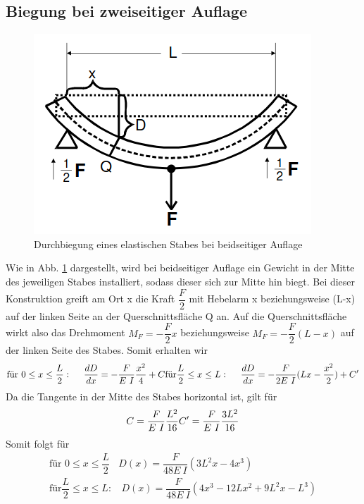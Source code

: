 \subsection{Biegung bei zweiseitiger Auflage}
    \begin{figure}
        \centering
        \includegraphics[scale=0.5]{Gemüsemedley.png}
        \caption{Durchbiegung eines elastischen Stabes bei beidseitiger Auflage}
        \label{fig:gemüse}
    \end{figure}
    Wie in Abb. \ref{fig:gemüse} dargestellt, wird bei beidseitiger Auflage ein Gewicht in der Mitte des 
    jeweiligen Stabes installiert, sodass dieser sich zur Mitte hin biegt. Bei dieser 
    Konstruktion greift am Ort x die Kraft $\dfrac{F}{2}$ mit Hebelarm x 
    beziehungsweise (L-x) auf der linken Seite an der Querschnittsfläche Q
    an. Auf die Querschnittsfläche wirkt also das Drehmoment $M_F = -\dfrac{F}{2} x$ 
    beziehungsweise $M_F = -\dfrac{F}{2}(L-x)$ auf der linken Seite des Stabes.
    Somit erhalten wir 
    \begin{equation}
        \text{für } 0 \leq x \leq \dfrac{L}{2}:\ \ \ \ \dfrac{d D}{dx}=-\dfrac{F}{E\ I}\dfrac{x^2}{4}+C \\
        \text{für} \dfrac{L}{2} \leq x \leq L:\ \ \ \ \dfrac{d D}{dx}=-\dfrac{F}{2 E\ I}(Lx - \dfrac{x^2}{2})+C'
    \end{equation}
    Da die Tangente in der Mitte des Stabes horizontal ist, gilt für 
    \begin{equation*}
        C = \dfrac{F}{E\ I}\dfrac{L^2}{16} \\
        C'=\dfrac{F}{E\ I}\dfrac{3L^2}{16}
    \end{equation*}
    Somit folgt für 
    \begin{align}
        \text{für } 0 \leq x \leq \dfrac{L}{2}\ \ \ \ D(x)=\dfrac{F}{48 E\ I}(3L^2x-4x^3) \\
        \text{für} \dfrac{L}{2} \leq x \leq L:\ \ \ \ D(x)=\dfrac{F}{48 E\ I}(4 x^3-12Lx^2+9L^2x-L^3) 
    \end{align}


